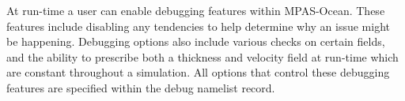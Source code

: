 At run-time a user can enable debugging features within MPAS-Ocean. These
features include disabling any tendencies to help determine why an issue might
be happening. Debugging options also include various checks on certain fields,
and the ability to prescribe both a thickness and velocity field at run-time
which are constant throughout a simulation. All options that control these
debugging features are specified within the debug namelist record.
